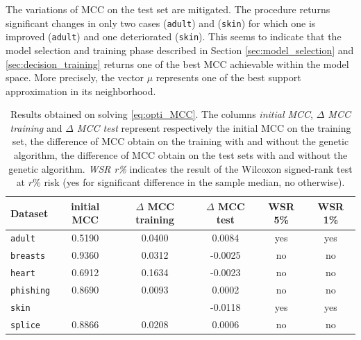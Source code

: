 \documentclass[preprint,12pt]{elsarticle}
\theoremstyle{definition}
\begin{document}
The variations of MCC on the test set are mitigated. The procedure returns significant changes in only two cases (\texttt{adult}) and (\texttt{skin}) for which one is improved (\texttt{adult}) and one deteriorated (\texttt{skin}). This seems to indicate that the model selection and training phase described in Section \ref{sec:model_selection} and \ref{sec:decision_training} returns one of the best MCC achievable within the model space. More precisely, the vector $\mu$ represents one of the best support approximation in its neighborhood. 


\begin{table}[h!]
\begin{center}
  \caption{Results obtained on solving \eqref{eq:opti_MCC}. The columns {\it initial MCC}, {\it $\Delta$ MCC training} and {\it$\Delta$ MCC test} represent respectively the initial MCC on the training set, the difference of MCC obtain on the training with and without the genetic algorithm, the difference of MCC obtain on the test sets with and without the genetic algorithm. {\it WSR r\%} indicates the result of the Wilcoxon signed-rank test at $r$\% risk (yes for significant difference in the sample median, no otherwise).}
  \begin{small}
\begin{tabular}{|l|c|c|c|c|c|}
\hline
  Dataset & initial MCC & $\Delta$ MCC training & $\Delta$ MCC test & WSR 5\% & WSR 1\%\\ \hline
 \texttt{adult} &  0.5190 & 0.0400 & 0.0084 & yes & yes \\
  \texttt{breasts} & 0.9360 & 0.0312 & -0.0025 & no & no \\
  \texttt{heart} & 0.6912 & 0.1634 & -0.0023 & no & no  \\
    \texttt{phishing} & 0.8690 &0.0093 & 0.0002  & no & no  \\
    \texttt{skin} & & & -0.0118 &  yes & yes \\
    \texttt{splice} & 0.8866 & 0.0208 & 0.0006 & no & no  \\\hline
\end{tabular}
\end{small}
  \label{table:opti_results}
\end{center}
\end{table}
\end{document}

